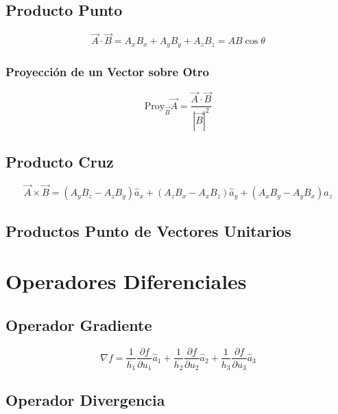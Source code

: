 \documentclass[12pt,a4paper,twocolumn]{article}
\begin{document}
\subsection*{Producto Punto}

\begin{equation*}
    \vec{A} \cdot \vec{B} = A_x B_x + A_y B_y + A_z B_z = AB \cos \theta
\end{equation*}

\subsubsection*{Proyección de un Vector sobre Otro}
\begin{equation*}
    \text{Proy}_{\vec{B}} \vec{A} = \frac{\vec{A} \cdot \vec{B}}{|\vec{B}|^2}
\end{equation*}

\subsection*{Producto Cruz}

\begin{equation*}
    \vec{A} \times \vec{B} = (A_y B_z - A_z B_y) \hat{a}_x + (A_z B_x - A_x B_z) \hat{a}_y + (A_x B_y - A_y B_x) \hat{a}_z
\end{equation*}

\subsection*{Productos Punto de Vectores Unitarios}

\section*{Operadores Diferenciales}

\subsection*{Operador Gradiente}

\begin{equation*}
    \nabla f = \frac{1}{h_1} \frac{\partial f}{\partial u_1} \hat{a}_1 + \frac{1}{h_2} \frac{\partial f}{\partial u_2} \hat{a}_2 + \frac{1}{h_3} \frac{\partial f}{\partial u_3} \hat{a}_3
\end{equation*}

\subsection*{Operador Divergencia}
\end{document}
